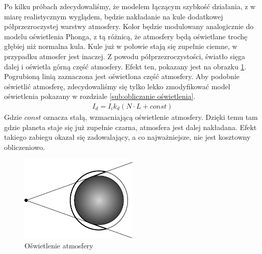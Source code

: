 Po kilku próbach zdecydowaliśmy, że modelem łączącym szybkość działania, z w miarę realistycznym wyglądem, będzie nakładanie na kule dodatkowej półprzezroczystej warstwy atmosfery. Kolor będzie modulowany analogicznie do modelu oświetlenia Phonga, z tą różnicą, że atmosfery będą oświetlane trochę głębiej niż normalna kula. Kule już w połowie stają się zupełnie ciemne, w przypadku atmosfer jest inaczej. Z powodu półprzezroczystości, światło sięga dalej i oświetla górną część atmosfery. Efekt ten, pokazany jest na obrazku \hyperref[fig:atmo]{\ref{fig:atmo}}. Pogrubioną linią zaznaczona jest oświetlona część atmosfery. Aby podobnie oświetlić atmosferę, zdecydowaliśmy się tylko lekko zmodyfikować model oświetlenia pokazany w rozdziale \hyperref[sub:obliczanie oświetlenia]{\ref{sub:obliczanie oświetlenia}}.
\begin{eqnarray}
I_d = I_i k_d( N \cdot L + const )
\end{eqnarray}
Gdzie $const$ oznacza stałą, wzmacniającą oświetlenie atmosfery. Dzięki temu tam gdzie planeta staje się już zupełnie czarna, atmosfera jest dalej nakładana. Efekt takiego zabiegu okazał się zadowalający, a co najważniejsze, nie jest kosztowny obliczeniowo.


\begin{figure}
\centering
	\includegraphics[width=0.5\textwidth]{img/atm.pdf}
\caption{Oświetlenie atmosfery}
\label{fig:atmo}
\end{figure}

\paragraph{}

